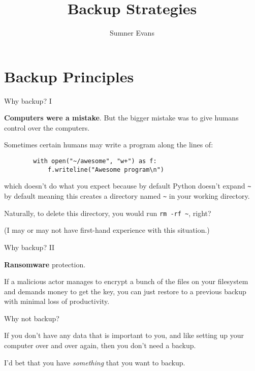 \documentclass{lug}
\title{Backup Strategies}
\author{Sumner Evans}
\institute{Mines Linux Users Group}
\begin{document}
\section{Backup Principles}

\begin{frame}[fragile]{Why backup? I}

    \textbf{Computers were a mistake}. \pause But the bigger mistake was to give humans
    control over the computers.

    \pause
    Sometimes certain humans may write a program along the lines of:
    \begin{verbatim}
        with open("~/awesome", "w+") as f:
            f.writeline("Awesome program\n")
    \end{verbatim}

    \pause which doesn't do what you expect because by default Python doesn't
    expand \texttt{\textasciitilde} by default meaning this creates a directory
    named \texttt{\textasciitilde} in your working directory.

    \pause Naturally, to delete this directory, you would run \texttt{rm -rf
    \textasciitilde}, right?

    \pause (I may or may not have first-hand experience with this situation.)

\end{frame}

\begin{frame}[fragile]{Why backup? II}

    \textbf{Ransomware} protection.

    \pause If a malicious actor manages to
    encrypt a bunch of the files on your filesystem and demands money to get the
    key, you can just restore to a previous backup with minimal loss of
    productivity.

\end{frame}

\begin{frame}{Why not backup?}

    If you don't have any data that is important to you, \pause and like setting
    up your computer over and over again, \pause then you don't need a backup.

    \pause I'd bet that you have \textit{something} that you want to backup.

\end{frame}
\end{document}
